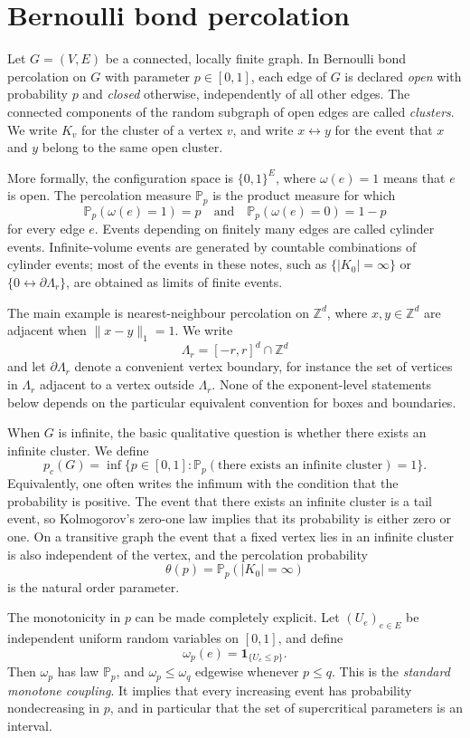 \documentclass[11pt,reqno]{book}
\numberwithin{equation}{chapter}
\theoremstyle{plain}
\theoremstyle{definition}
\theoremstyle{remark}
\newcommand{\Pp}{\mathbb P_p}
\newcommand{\Z}{\mathbb Z}
\newcommand{\1}{\mathbf 1}
\newcommand{\norm}[1]{\lVert #1\rVert}
\begin{document}
\section{Bernoulli bond percolation}

Let $G=(V,E)$ be a connected, locally finite graph. In Bernoulli bond percolation on $G$ with parameter $p\in[0,1]$, each edge of $G$ is declared \emph{open} with probability $p$ and \emph{closed} otherwise, independently of all other edges. The connected components of the random subgraph of open edges are called \emph{clusters}. We write $K_v$ for the cluster of a vertex $v$, and write $x\leftrightarrow y$ for the event that $x$ and $y$ belong to the same open cluster.

More formally, the configuration space is $\{0,1\}^E$, where $\omega(e)=1$ means that $e$ is open. The percolation measure $\Pp$ is the product measure for which
\[
  \Pp(\omega(e)=1)=p
  \quad\text{and}\quad
  \Pp(\omega(e)=0)=1-p
\]
for every edge $e$. Events depending on finitely many edges are called cylinder events. Infinite-volume events are generated by countable combinations of cylinder events; most of the events in these notes, such as $\{|K_0|=\infty\}$ or $\{0\leftrightarrow \partial\Lambda_r\}$, are obtained as limits of finite events.

The main example is nearest-neighbour percolation on $\Z^d$, where $x,y\in\Z^d$ are adjacent when $\norm{x-y}_1=1$. We write
\[
  \Lambda_r=[-r,r]^d\cap\Z^d
\]
and let $\partial\Lambda_r$ denote a convenient vertex boundary, for instance the set of vertices in $\Lambda_r$ adjacent to a vertex outside $\Lambda_r$. None of the exponent-level statements below depends on the particular equivalent convention for boxes and boundaries.

When $G$ is infinite, the basic qualitative question is whether there exists an infinite cluster. We define
\[
  p_c(G)=\inf\{p\in[0,1]: \Pp(\text{there exists an infinite cluster})=1\}.
\]
Equivalently, one often writes the infimum with the condition that the probability is positive. The event that there exists an infinite cluster is a tail event, so Kolmogorov's zero-one law implies that its probability is either zero or one. On a transitive graph the event that a fixed vertex lies in an infinite cluster is also independent of the vertex, and the percolation probability
\[
  \theta(p)=\Pp(|K_0|=\infty)
\]
is the natural order parameter.

The monotonicity in $p$ can be made completely explicit. Let $(U_e)_{e\in E}$ be independent uniform random variables on $[0,1]$, and define
\[
  \omega_p(e)=\1_{\{U_e\leq p\}}.
\]
Then $\omega_p$ has law $\Pp$, and $\omega_p\leq \omega_q$ edgewise whenever $p\leq q$. This is the \emph{standard monotone coupling}. It implies that every increasing event has probability nondecreasing in $p$, and in particular that the set of supercritical parameters is an interval.
\end{document}
